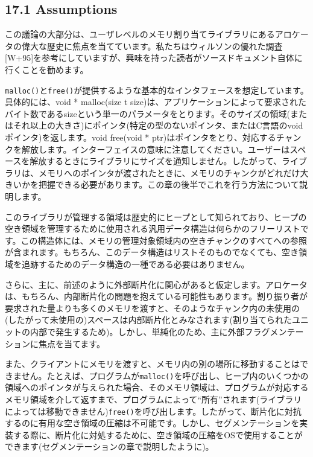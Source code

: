 \hypertarget{assumptions-1}{%
\subsection*{17.1 Assumptions}\label{assumptions-1}}

この議論の大部分は、ユーザレベルのメモリ割り当てライブラリにあるアロケータの偉大な歴史に焦点を当てています。私たちはウィルソンの優れた調査{[}W+95{]}を参考にしていますが、興味を持った読者がソースドキュメント自体に行くことを勧めます。

\texttt{malloc()}と\texttt{free()}が提供するような基本的なインタフェースを想定しています。具体的には、void
* malloc(size t
size)は、アプリケーションによって要求されたバイト数であるsizeという単一のパラメータをとります。そのサイズの領域(またはそれ以上の大きさ)にポインタ(特定の型のないポインタ、またはC言語のvoidポインタ)を返します。void
free(void *
ptr)はポインタをとり、対応するチャンクを解放します。インターフェイスの意味に注意してください。ユーザーはスペースを解放するときにライブラリにサイズを通知しません。したがって、ライブラリは、メモリへのポインタが渡されたときに、メモリのチャンクがどれだけ大きいかを把握できる必要があります。この章の後半でこれを行う方法について説明します。

このライブラリが管理する領域は歴史的にヒープとして知られており、ヒープの空き領域を管理するために使用される汎用データ構造は何らかのフリーリストです。この構造体には、メモリの管理対象領域内の空きチャンクのすべてへの参照が含まれます。もちろん、このデータ構造はリストそのものでなくても、空き領域を追跡するためのデータ構造の一種である必要はありません。

さらに、主に、前述のように外部断片化に関心があると仮定します。アロケータは、もちろん、内部断片化の問題を抱えている可能性もあります。割り振り者が要求された量よりも多くのメモリを渡すと、そのようなチャンク内の未使用の(したがって未使用の)スペースは内部断片化とみなされます(割り当てられたユニットの内部で発生するため)。しかし、単純化のため、主に外部フラグメンテーションに焦点を当てます。

また、クライアントにメモリを渡すと、メモリ内の別の場所に移動することはできません。たとえば、プログラムが\texttt{malloc()}を呼び出し、ヒープ内のいくつかの領域へのポインタが与えられた場合、そのメモリ領域は、プログラムが対応するメモリ領域を介して返すまで、プログラムによって``所有''されます(ライブラリによっては移動できません)\texttt{free()}を呼び出します。したがって、断片化に対抗するのに有用な空き領域の圧縮は不可能です。しかし、セグメンテーションを実装する際に、断片化に対処するために、空き領域の圧縮をOSで使用することができます(セグメンテーションの章で説明したように)。

